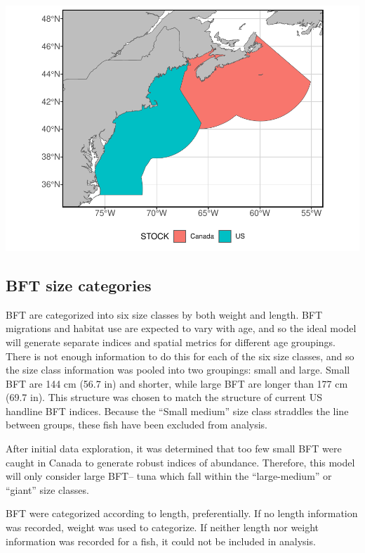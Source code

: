 \documentclass[
]{article}
\let\origfigure\figure
\let\endorigfigure\endfigure
\renewenvironment{figure}[1][2] {
    \expandafter\origfigure\expandafter[H]
} {
    \endorigfigure
}
\begin{document}
\begin{figure}
\centering
\includegraphics{Model_Prelim_Report_files/figure-latex/spatial-domain-1.pdf}
\caption{\label{fig:spatial-domain}Fig. 1: VAST model spatial domain}
\end{figure}

\hypertarget{bft-size-categories}{%
\subsection{BFT size categories}\label{bft-size-categories}}

BFT are categorized into six size classes by both weight and length. BFT migrations and habitat use are expected to vary with age, and so the ideal model will generate separate indices and spatial metrics for different age groupings. There is not enough information to do this for each of the six size classes, and so the size class information was pooled into two groupings: small and large. Small BFT are 144 cm (56.7 in) and shorter, while large BFT are longer than 177 cm (69.7 in). This structure was chosen to match the structure of current US handline BFT indices. Because the ``Small medium'' size class straddles the line between groups, these fish have been excluded from analysis.

After initial data exploration, it was determined that too few small BFT were caught in Canada to generate robust indices of abundance. Therefore, this model will only consider large BFT-- tuna which fall within the ``large-medium'' or ``giant'' size classes.

BFT were categorized according to length, preferentially. If no length information was recorded, weight was used to categorize. If neither length nor weight information was recorded for a fish, it could not be included in analysis.
\end{document}
